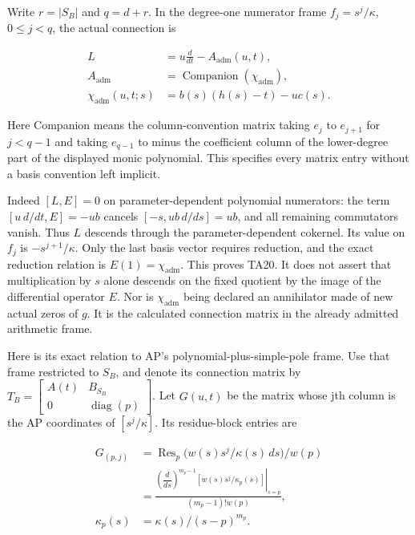 Write \(r=|S_B|\) and \(q=d+r\). In the degree-one numerator frame
\(f_j=s^j/\kappa\), \(0\le j<q\), the actual connection is

\[
\begin{aligned}L&=u\frac{d}{dt}-A_{\mathrm{adm}}(u,t),\\A_{\mathrm{adm}}&=\operatorname{Companion}(\chi_{\mathrm{adm}}),\\\chi_{\mathrm{adm}}(u,t;s)&=b(s)(h(s)-t)-uc(s).\end{aligned}\tag{TA20}
\]

Here Companion means the column-convention matrix taking \(e_j\text{ to }e_{j+1}\)
for \(j<q-1\) and taking \(e_{q-1}\) to minus the coefficient column of the
lower-degree part of the displayed monic polynomial. This specifies every
matrix entry without a basis convention left implicit.

Indeed \([L,E]=0\) on parameter-dependent polynomial numerators: the term
\([u\,d/dt,E]=-ub\) cancels \([-s,ub\,d/ds]=ub\), and all remaining commutators
vanish. Thus \(L\) descends through the parameter-dependent cokernel. Its value
on \(f_j\) is \(-s^{j+1}/\kappa\). Only the last basis vector requires reduction,
and the exact reduction relation is \(E(1)=\chi_{\mathrm{adm}}\). This proves TA20.
It does not assert that multiplication by \(s\) alone descends on the fixed
quotient by the image of the differential operator \(E\). Nor is \(\chi_{\mathrm{adm}}\) being
declared an annihilator made of new actual zeros of \(g\). It is the calculated
connection matrix in the already admitted arithmetic frame.

Here is its exact relation to AP's polynomial-plus-simple-pole frame.
Use that frame restricted to \(S_B\), and denote its connection matrix by
\(T_B=\begin{bmatrix}A(t)&B_{S_B}\\0&\operatorname{diag}(p)\end{bmatrix}\). Let \(G(u,t)\) be the matrix whose jth column
is the AP coordinates of \([s^j/\kappa]\). Its residue-block entries are

\[
\begin{aligned}G_{(p,j)}&=\operatorname{Res}_p\bigl(w(s)s^j/\kappa(s)\,ds\bigr)/w(p)\\&=\frac{\left.\left(\dfrac{d}{ds}\right)^{m_p-1}\left[w(s)s^j/\kappa_p(s)\right]\right|_{s=p}}{(m_p-1)!w(p)},\\\kappa_p(s)&=\kappa(s)/(s-p)^{m_p}.\end{aligned}\tag{TA21}
\]

